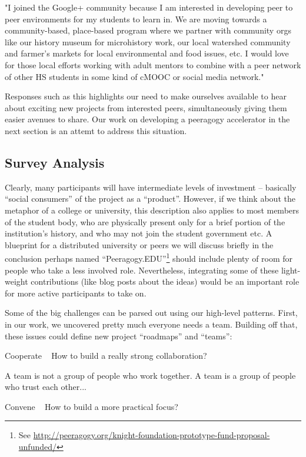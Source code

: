 \documentclass{acm_proc_article-sp}
\begin{document}
"I joined the Google+ community because I am interested in developing peer to peer environments for my students to learn in. We are moving towards a community-based, place-based program where we partner with community orgs like our history museum for microhistory work, our local watershed community and farmer's markets for local environmental and food issues, etc. I would love for those local efforts working with adult mentors to combine with a peer network of other HS students in some kind of cMOOC or social media network."

Responses such as this highlights our need to make ourselves available to hear about exciting new projects from interested peers, simultaneously giving them easier avenues to share. Our work on developing a peeragogy accelerator in the next section is an attemt to address this situation.

\subsection{Survey Analysis}

Clearly, many participants will have intermediate levels of investment -- basically ``social consumers'' of the project as a ``product''. However, if we think about the metaphor of a college or university, this description also applies to most members of the student body, who are physically present only for a brief portion of the institution's history, and who may not join the student government etc. A blueprint for a distributed university or peers we will discuss briefly in the conclusion perhaps named ``Peeragogy.EDU''\footnote{See \url{http://peeragogy.org/knight-foundation-prototype-fund-proposal-unfunded/}} should include plenty of room for people who take a less involved role. Nevertheless, integrating some of these light-weight contributions (like blog posts about the ideas) would be an important role for more active participants to take on.

Some of the big challenges can be parsed out using our high-level patterns. First, in our work, we uncovered pretty much everyone needs a team. Building off that, these issues could define new project ``roadmaps'' and ``teams'':

    Cooperate ~ How to build a really strong collaboration?

        A team is not a group of people who work together. A team is a group of people who trust each other...

    Convene ~ How to build a more practical focus?
\end{document}
